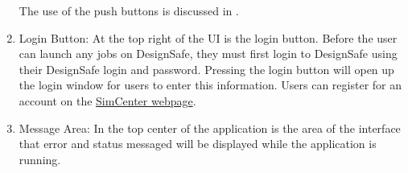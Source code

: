 \begin{enumerate}
The use of the push buttons is discussed in .

\item Login Button: At the top right of the UI is the login
  button. Before the user can launch any jobs on DesignSafe, they must
  first login to DesignSafe using their DesignSafe login and
  password. Pressing the login button will open up the login window
  for users to enter this information. Users can register for an
  account on
  the \href{https://www.designsafe-ci.org/account/register/}{SimCenter
  webpage}.

\item Message Area: In the top center of the application is the area
  of the interface that error and status messaged will be displayed
  while the application is running.

\end{enumerate}
